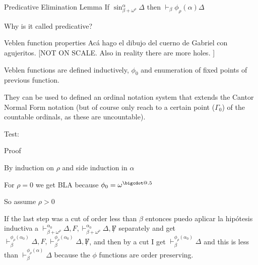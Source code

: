 \documentclass[10pt]{beamer}
\makeatletter
\def\sint{\vdash}
\newcommand*\bigcdot{\mathpalette\bigcdot@{.5}}
\newcommand*\bigcdot@[2]{\mathbin{\vcenter{\hbox{\scalebox{#2}{$\m@th#1\bullet$}}}}}
\def\fomega{{\omega}^{\bigcdot}}
\makeatother
\begin{document}
\begin{frame}{Predicative Elimination Lemma}
If $\sin_{\beta + \omega^\rho}^{\alpha} \Delta$ then $\sint_\beta{\phi_\rho(\alpha)} \Delta$

\begin{tcolorbox}
Why is it called predicative?
\end{tcolorbox}
\end{frame}

\begin{frame}{Veblen function properties}
Acá hago el dibujo del cuerno de Gabriel con agujeritos. [NOT ON SCALE. Also in reality there are more holes. ] %

Veblen functions are defined inductively, $\phi_0$ and enumeration of fixed points of previous function.

They can be used to defined an ordinal notation system that extends the Cantor Normal Form notation (but of course only reach to a certain point ($\Gamma_0$) of the countable ordinals, as these are uncountable).

\end{frame}

\begin{frame}
Test:

\end{frame}



\begin{frame}{Proof}



By induction on $\rho$ and side induction in $\alpha$ %

For $\rho=0$ we get BLA because $\phi_0 = \fomega$ \pause

So assume $\rho > 0$ %

If the last step was a cut of order less than $\beta$ entonces puedo aplicar la hipótesis inductiva a $\sint^{\alpha_0}_{\beta + \omega^\rho} \Delta, F, \sint^{\alpha_0}_{\beta + \omega^\rho} \Delta, \not F$ separately and get $\sint^{\phi_\rho(\alpha_0)}_{\beta } \Delta, F, \sint^{\phi_\rho(\alpha_0)}_{\beta } \Delta, \not F$, and then by a cut I get $\sint^{\phi_\rho(\alpha_0)}_{\beta } \Delta$ and this is less than $\sint^{\phi_\rho(\alpha)}_{\beta } \Delta$ because the $\phi$ functions are order preserving.


\end{frame}
\end{document}

